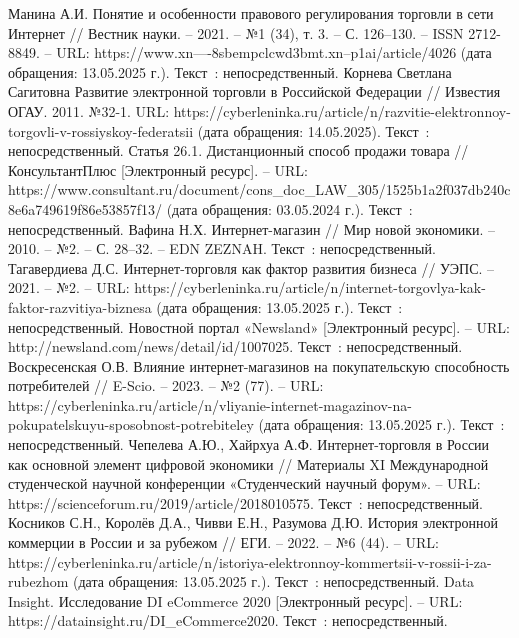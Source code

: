 
\begin{thebibliography}{9}

     Манина А.И. Понятие и особенности правового регулирования торговли в сети Интернет // Вестник науки. – 2021. – №1 (34), т. 3. – С. 126–130. – ISSN 2712-8849. – URL: https://www.xn----8sbempclcwd3bmt.xn--p1ai/article/4026 (дата обращения: 13.05.2025 г.). Текст~: непосредственный.
     Корнева Светлана Сагитовна Развитие электронной торговли в Российской Федерации // Известия ОГАУ. 2011. №32-1. URL: https://cyberleninka.ru/article/n/razvitie-elektronnoy-torgovli-v-rossiyskoy-federatsii (дата обращения: 14.05.2025). Текст~: непосредственный.
     Статья 26.1. Дистанционный способ продажи товара // КонсультантПлюс [Электронный ресурс]. – URL: https://www.consultant.ru/document/cons\_doc\_LAW\_305/1525b1a2f037db240c8e6a749619f86e53857f13/ (дата обращения: 03.05.2024 г.). Текст~: непосредственный.
     Вафина Н.Х. Интернет-магазин // Мир новой экономики. – 2010. – №2. – С. 28–32. – EDN ZEZNAH. Текст~: непосредственный.
	 Тагавердиева Д.С. Интернет-торговля как фактор развития бизнеса // УЭПС. – 2021. – №2. – URL: https://cyberleninka.ru/article/n/internet-torgovlya-kak-faktor-razvitiya-biznesa (дата обращения: 13.05.2025 г.). Текст~: непосредственный.
	 Новостной портал «Newsland» [Электронный ресурс]. – URL: http://newsland.com/news/detail/id/1007025. Текст~: непосредственный.
	 Воскресенская О.В. Влияние интернет-магазинов на покупательскую способность потребителей // E-Scio. – 2023. – №2 (77). – URL: https://cyberleninka.ru/article/n/vliyanie-internet-magazinov-na-pokupatelskuyu-sposobnost-potrebiteley (дата обращения: 13.05.2025 г.). Текст~: непосредственный.
	 Чепелева А.Ю., Хайрхуа А.Ф. Интернет-торговля в России как основной элемент цифровой экономики // Материалы XI Международной студенческой научной конференции «Студенческий научный форум». – URL: https://scienceforum.ru/2019/article/2018010575. Текст~: непосредственный.
	 Косников С.Н., Королёв Д.А., Чивви Е.Н., Разумова Д.Ю. История электронной коммерции в России и за рубежом // ЕГИ. – 2022. – №6 (44). – URL: https://cyberleninka.ru/article/n/istoriya-elektronnoy-kommertsii-v-rossii-i-za-rubezhom (дата обращения: 13.05.2025 г.). Текст~: непосредственный.
	 Data Insight. Исследование DI eCommerce 2020 [Электронный ресурс]. – URL: https://datainsight.ru/DI\_eCommerce2020. Текст~: непосредственный.

\end{thebibliography}
